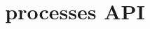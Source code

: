 \graphicspath{{./figures/}}
\title{processes API}
\date{}

\begin{frame}
    \titlepage
\end{frame}







